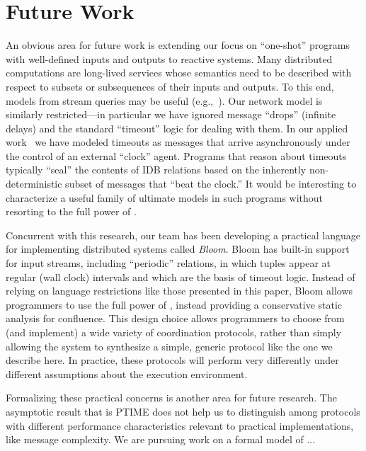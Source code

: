 \section{Future Work}
\label{sec:conclusion}

An obvious area for future work is extending our focus on ``one-shot'' programs with well-defined inputs and outputs to reactive systems.  
Many distributed computations are long-lived services whose semantics need to be described with respect to subsets or subsequences of their inputs and outputs.  To this end, models from stream queries may be useful (e.g.,~\cite{Chandramouli2009}).  
Our network model is similarly restricted---in particular we have ignored message ``drops'' (infinite delays) and the standard ``timeout'' logic for dealing with them.  In our applied work~\cite{boom,cidr11} we have modeled timeouts as messages that arrive asynchronously under the control of an external ``clock'' agent.  Programs that reason about timeouts typically ``seal'' the contents of IDB relations based on the inherently non-deterministic subset of messages that ``beat the clock.''  It would be interesting to characterize a useful family of ultimate models in such programs without resorting to the full power of \lang.

Concurrent with this research, our team has been developing a practical language for implementing distributed
systems called \emph{Bloom}.  Bloom has built-in support for input streams, including ``periodic'' relations,
in which tuples appear at regular (wall clock) intervals and which are the basis of timeout logic.
Instead of relying on language restrictions like those presented in this paper, Bloom allows programmers to use the full
power of \lang, instead providing a conservative static analysis for confluence.
This design choice allows programmers to choose from (and implement) a wide variety of coordination protocols, rather than
simply allowing the system to synthesize a simple, generic protocol like the one we describe here.  
In practice, these protocols will perform very differently under different assumptions about the execution environment.

Formalizing these practical concerns is another area for future research.  The asymptotic result that \plang is PTIME
does not help us to distinguish among protocols with different performance characteristics relevant to practical
implementations, like message complexity.  We are pursuing work on a formal model of ...


